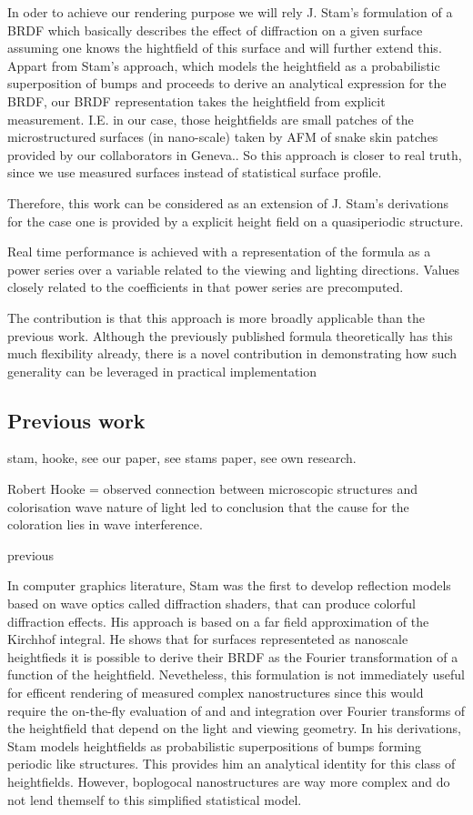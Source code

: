 In oder to achieve our rendering purpose we will rely J. Stam's formulation of a BRDF which basically describes the effect of diffraction on a given surface assuming one knows the hightfield of this surface and will further extend this. Appart from Stam's approach, which models the heightfield as a probabilistic superposition of bumps and proceeds to derive an analytical expression for the BRDF, our BRDF representation takes the heightfield from explicit measurement. 
I.E. in our case, those heightfields are small patches of the microstructured surfaces (in nano-scale) taken by AFM of snake skin patches provided by our collaborators in Geneva..
So this approach is closer to real truth, since we use measured surfaces instead of statistical surface profile.

Therefore, this work can be considered as an extension of J. Stam's derivations for the case one is provided by a explicit height field on a quasiperiodic structure.

Real time performance is achieved with a representation of the formula as a power series over a variable related to the viewing and lighting directions. Values closely related to the coefficients in that power series are precomputed.

The contribution is that this approach is more broadly applicable than the previous work. Although the previously published formula theoretically has this much flexibility already, there is a novel contribution in demonstrating how such generality can be leveraged in practical implementation


\subsection{Previous work}
stam, hooke, see our paper, see stams paper, see own research.


Robert Hooke = observed connection between microscopic structures and colorisation
wave nature of light led to conclusion that the cause for the coloration lies in wave interference.

previous

In computer graphics literature, Stam was the first to develop reflection models based on wave optics called diffraction shaders, that can produce colorful diffraction effects. His approach is based on a far field approximation of the Kirchhof integral. He shows that for surfaces representeted as nanoscale heightfieds it is possible to derive their BRDF as the Fourier transformation of a function of the heightfield. Nevetheless, this formulation is not immediately useful for efficent rendering of measured complex nanostructures since this would require the on-the-fly evaluation of and and integration over Fourier transforms of the heightfield that depend on the light and viewing geometry. In his derivations, Stam models heightfields as probabilistic superpositions of bumps forming periodic like structures. This provides him an analytical identity for this class of heightfields. However, boplogocal nanostructures are way more complex and do not lend themself to this simplified statistical model.

